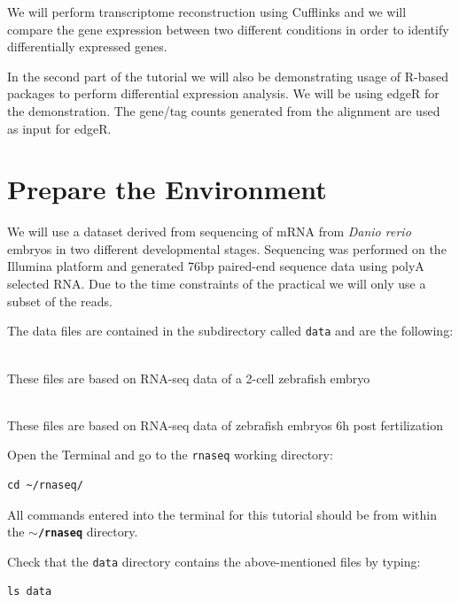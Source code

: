 We will perform transcriptome reconstruction using Cufflinks and we will compare
the gene expression between two different conditions in order to identify
differentially expressed genes.

In the second part of the tutorial we will also be demonstrating usage of R-based packages to perform differential expression analysis.
We will be using edgeR for the demonstration. The gene/tag counts generated from the alignment are used as input for edgeR.
\section{Prepare the Environment}
We will use a dataset derived from sequencing of mRNA from \textit{Danio rerio} embryos
in two different developmental stages. Sequencing was performed on the Illumina
platform and generated 76bp paired-end sequence data using polyA selected RNA.
Due to the time constraints of the practical we will only use a subset of the
reads.

The data files are contained in the subdirectory called \texttt{data} and are
the following:
\begin{description}[style=multiline,labelindent=1.5cm,align=left,leftmargin=2.5cm]
  \item[\texttt{2cells\_1.fastq} and \texttt{2cells\_2.fastq}] \hfill\\
 These files are based on RNA-seq data of a 2-cell zebrafish embryo
  \item[\texttt{6h\_1.fastq} and \texttt{6h\_2.fastq}] \hfill\\
 These files are based on RNA-seq data of zebrafish embryos 6h post
 fertilization
\end{description}

\begin{steps}
Open the Terminal and go to the \texttt{rnaseq} working directory:
\begin{lstlisting}
cd ~/rnaseq/
\end{lstlisting}
\end{steps}

\begin{warning}
  All commands entered into the terminal for this tutorial should be from within the
  \textbf{\texttt{$\sim$/rnaseq}} directory.
\end{warning}

\begin{steps}
Check that the \texttt{data} directory contains the above-mentioned files by typing:
\begin{lstlisting}
ls data
\end{lstlisting}
\end{steps}

